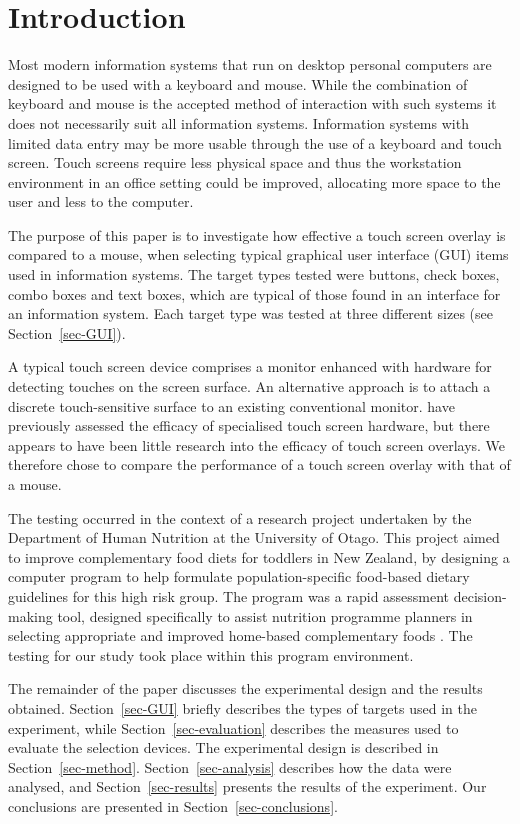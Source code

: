 \documentclass{elsart}
\begin{document}
\section{Introduction}
\label{sec-introduction}

Most modern information systems that run on desktop personal computers
are designed to be used with a keyboard and mouse. While the combination
of keyboard and mouse is the accepted method of interaction with such
systems it does not necessarily suit all information systems.
Information systems with limited data entry may be more usable through
the use of a keyboard and touch screen. Touch screens require less
physical space and thus the workstation environment in an office setting
could be improved, allocating more space to the user and less to the
computer.

The purpose of this paper is to investigate how effective a touch screen
overlay is compared to a mouse, when selecting typical graphical user
interface (GUI) items used in information systems. The target types
tested were buttons, check boxes, combo boxes and text boxes, which are
typical of those found in an interface for an information system. Each
target type was tested at three different sizes (see
Section~\ref{sec-GUI}).

A typical touch screen device comprises a monitor enhanced with hardware
for detecting touches on the screen surface. An alternative approach is
to attach a discrete touch-sensitive surface to an existing conventional
monitor. \citet{Sear-A-1991-IJMMS} have previously assessed the efficacy
of specialised touch screen hardware, but there appears to have been
little research into the efficacy of touch screen overlays. We therefore
chose to compare the performance of a touch screen overlay with that of
a mouse.

The testing occurred in the context of a research project undertaken by
the Department of Human Nutrition at the University of Otago. This
project aimed to improve complementary food diets for toddlers in New
Zealand, by designing a computer program to help formulate
population-specific food-based dietary guidelines for this high risk
group. The program was a rapid assessment decision-making tool, designed
specifically to assist nutrition programme planners in selecting
appropriate and improved home-based complementary foods
\citep{Ferg-E-2004}. The testing for our study took place within this
program environment.

The remainder of the paper discusses the experimental design and the
results obtained. Section~\ref{sec-GUI} briefly describes the types of
targets used in the experiment, while Section~\ref{sec-evaluation}
describes the measures used to evaluate the selection devices. The
experimental design is described in Section~\ref{sec-method}.
Section~\ref{sec-analysis} describes how the data were analysed, and
Section~\ref{sec-results} presents the results of the experiment. Our
conclusions are presented in Section~\ref{sec-conclusions}.
\end{document}
